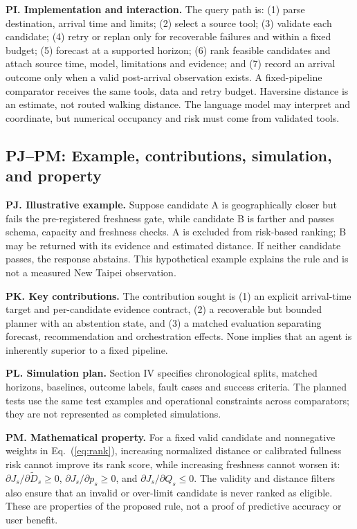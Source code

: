 \documentclass[conference,letterpaper,10pt]{IEEEtran}
\begin{document}
\noindent\textbf{PI. Implementation and interaction.} The query path is: (1) parse destination, arrival time and limits; (2) select a source tool; (3) validate each candidate; (4) retry or replan only for recoverable failures and within a fixed budget; (5) forecast at a supported horizon; (6) rank feasible candidates and attach source time, model, limitations and evidence; and (7) record an arrival outcome only when a valid post-arrival observation exists. A fixed-pipeline comparator receives the same tools, data and retry budget. Haversine distance is an estimate, not routed walking distance. The language model may interpret and coordinate, but numerical occupancy and risk must come from validated tools.

\subsection{PJ--PM: Example, contributions, simulation, and property}
\noindent\textbf{PJ. Illustrative example.} Suppose candidate A is geographically closer but fails the pre-registered freshness gate, while candidate B is farther and passes schema, capacity and freshness checks. A is excluded from risk-based ranking; B may be returned with its evidence and estimated distance. If neither candidate passes, the response abstains. This hypothetical example explains the rule and is not a measured New Taipei observation.

\noindent\textbf{PK. Key contributions.} The contribution sought is (1) an explicit arrival-time target and per-candidate evidence contract, (2) a recoverable but bounded planner with an abstention state, and (3) a matched evaluation separating forecast, recommendation and orchestration effects. None implies that an agent is inherently superior to a fixed pipeline.

\noindent\textbf{PL. Simulation plan.} Section IV specifies chronological splits, matched horizons, baselines, outcome labels, fault cases and success criteria. The planned tests use the same test examples and operational constraints across comparators; they are not represented as completed simulations.

\noindent\textbf{PM. Mathematical property.} For a fixed valid candidate and nonnegative weights in Eq.~(\ref{eq:rank}), increasing normalized distance or calibrated fullness risk cannot improve its rank score, while increasing freshness cannot worsen it: $\partial J_s/\partial\widetilde{D}_s\geq0$, $\partial J_s/\partial p_s\geq0$, and $\partial J_s/\partial Q_s\leq0$. The validity and distance filters also ensure that an invalid or over-limit candidate is never ranked as eligible. These are properties of the proposed rule, not a proof of predictive accuracy or user benefit.
\end{document}
